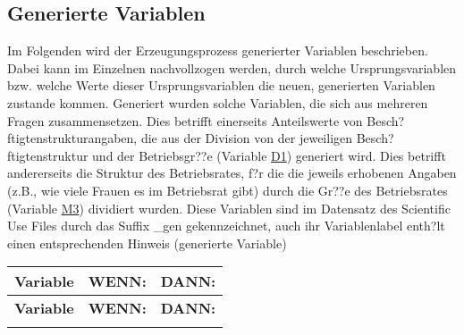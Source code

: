\subsection{Generierte Variablen}\label{var_generiert} 

Im Folgenden wird der Erzeugungsprozess generierter Variablen beschrieben. Dabei kann im Einzelnen
nachvollzogen werden, durch welche Ursprungsvariablen bzw. welche Werte dieser Ursprungsvariablen die neuen, generierten
Variablen zustande kommen. Generiert wurden solche Variablen, die sich aus mehreren Fragen zusammensetzen. Dies betrifft einerseits Anteilswerte von Besch?ftigtenstrukturangaben, die aus der Division von  der jeweiligen Besch?ftigtenstruktur und der Betriebsgr??e (Variable \hyperref[var:D1]{D1}) generiert wird. Dies betrifft andererseits die Struktur des Betriebsrates, f?r die die jeweils erhobenen Angaben (z.B., wie viele Frauen es im Betriebsrat gibt) durch die Gr??e des Betriebsrates (Variable \hyperref[var:M3]{M3}) dividiert wurden. Diese Variablen sind im Datensatz des Scientific Use Files durch das Suffix \glqq \_gen \grqq\xspace gekennzeichnet, auch ihr Variablenlabel enth?lt einen entsprechenden Hinweis (\grqq generierte Variable\grqq )

\begin{longtable}{!{\color{black}\vline width 1pt} L{2.5cm} !{\color{black}\vline width 1pt} L{9.125cm} | L{5.125cm} !{\color{black}\vline width 1pt}  }
	
	\toprule
		\textbf{Variable} & \textbf{WENN:} & \textbf{DANN:}  \\ 
	\midrule
	\endfirsthead
	\toprule
		\textbf{Variable} & \textbf{WENN:} & \textbf{DANN:}  \\ 
	\midrule
	\endhead
	
	\midrule
	
	\endfoot
	\bottomrule
	\endlastfoot
		
	
	
\end{longtable}

